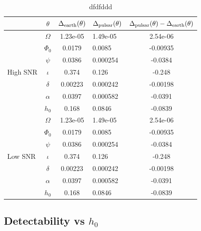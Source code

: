 \documentclass[fleqn,usenatbib,useAMS]{mnras}
\begin{document}
\begin{table}
	\centering
		\begin{tabular}{lcclc}
			\toprule
			&$\theta$ & $\Delta_{\rm earth}(\theta)$ & $\Delta_{\rm pulsar}(\theta)$ & $\Delta_{\rm pulsar}(\theta) -\Delta_{\rm earth}(\theta) $   \\
			\hline
			\multirow{7}{2mm}{High SNR} & $\Omega$       & 1.23e-05 &1.49e-05 &2.54e-06 \\
			& $\Phi_0$ &0.0179 &0.0085& -0.00935 \\
			& $\psi$ &0.0386& 0.000254& -0.0384 \\
			& $\iota$ & 0.374 &0.126 &-0.248 \\
			& $\delta$ & 0.00223 &0.000242& -0.00198 \\
			&$\alpha$ &0.0397 &0.000582 &-0.0391 \\
			&$h_0$ & 0.168 &0.0846 &-0.0839 \\
			\hline
			\multirow{7}{2mm}{Low SNR} & $\Omega$       & 1.23e-05 &1.49e-05 &2.54e-06 \\
			& $\Phi_0$ &0.0179 &0.0085& -0.00935 \\
			& $\psi$ &0.0386& 0.000254& -0.0384 \\
			& $\iota$ & 0.374 &0.126 &-0.248 \\
			& $\delta$ & 0.00223 &0.000242& -0.00198 \\
			&$\alpha$ &0.0397 &0.000582 &-0.0391 \\
			&$h_0$ & 0.168 &0.0846 &-0.0839 \\
			
			\bottomrule
		\end{tabular}
		\caption{dfdfddd}
		\label{tab:posterior_errors}
	\end{table}


		
\subsection{Detectability vs $h_0$}\label{sec:psr_v_earth_bayes}
		
\end{document}
